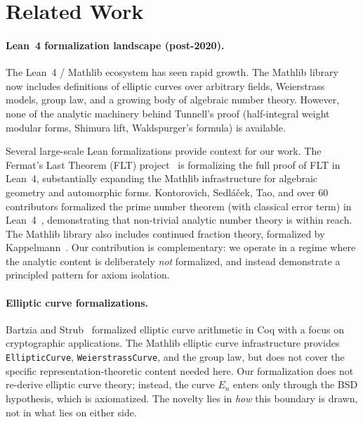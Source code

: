 \documentclass[11pt,a4paper]{article}
\theoremstyle{definition}
\newcommand{\lean}[1]{\texttt{#1}}
\begin{document}
\section{Related Work}\label{sec:related}

\paragraph{Lean~4 formalization landscape (post-2020).}
The Lean~4 / Mathlib ecosystem has seen rapid growth.
The Mathlib library~\cite{Mathlib2024} now includes definitions
of elliptic curves over arbitrary fields, Weierstrass models,
group law, and a growing body of algebraic number theory.
However, none of the analytic machinery behind Tunnell's proof
(half-integral weight modular forms, Shimura lift, Waldspurger's
formula) is available.

Several large-scale Lean formalizations provide context for our work.
The Fermat's Last Theorem (FLT) project~\cite{FLT2024} is formalizing
the full proof of FLT in Lean~4, substantially expanding the
Mathlib infrastructure for algebraic geometry and automorphic forms.
Kontorovich, Sedl\'{a}\v{c}ek, Tao, and over 60 contributors
formalized the prime number theorem (with classical error term)
in Lean~4~\cite{PNTLean2024}, demonstrating that non-trivial
analytic number theory is within reach.
The Mathlib library also includes continued fraction theory,
formalized by Kappelmann~\cite{Kappelmann2024}.
Our contribution is complementary: we operate in a regime where
the analytic content is deliberately \emph{not} formalized, and
instead demonstrate a principled pattern for axiom isolation.

\paragraph{Elliptic curve formalizations.}
Bartzia and Strub~\cite{BartziaStrub2014} formalized elliptic curve
arithmetic in Coq with a focus on cryptographic applications.
The Mathlib elliptic curve infrastructure provides \lean{EllipticCurve},
\lean{WeierstrassCurve}, and the group law, but does not cover
the specific representation-theoretic content needed here.
Our formalization does not re-derive elliptic curve theory; instead,
the curve $E_n$ enters only through the BSD hypothesis, which is
axiomatized.  The novelty lies in \emph{how} this boundary is drawn,
not in what lies on either side.
\end{document}
